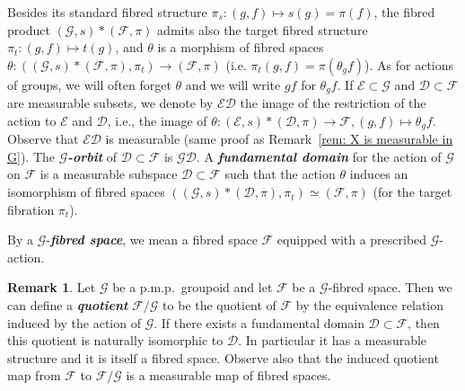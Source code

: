 \documentclass[10pt]{amsart}
\theoremstyle{definition}
\newtheorem{rema}[cdrthm]{Remark}
\newcommand{\defin}[1]{\textbf{\emph{#1}}}
\newcommand{\coarse}{\mathcal{E}}
\newcommand{\cg}{\mathcal{G}}
\newcommand{\cf}{\mathcal{F}}
\newcommand{\cd}{\mathcal{D}}
\newcommand{\pmp}{p.m.p.\ }
\begin{document}
Besides its standard fibred structure $\pi_s:(g,f)\mapsto s(g)=\pi(f)$, the fibred product $(\cg,s) \ast (\cf,\pi)$ admits also the target fibred structure $\pi_t:(g,f)\mapsto t(g)$, and $\theta$ is a morphism of fibred spaces $\theta:((\cg,s) \ast (\cf,\pi), \pi_t) \to (\cf,\pi)$ (i.e. $\pi_t(g,f)=\pi(\theta_g f)$). As for actions of groups, we will often forget $\theta$ and we will write $gf$ for $\theta_g f$. If $\coarse \subset \cg$ and $\cd \subset \cf$ are measurable subsets, we denote by $\coarse \cd$ the image of the restriction of the action to $\coarse$ and $\cd$, i.e., the image of $\theta:(\coarse,s)*(\cd, \pi)\rightarrow \cf, (g,f)\mapsto \theta_g f$. Observe that $\coarse \cd$ is measurable (same proof as Remark~\ref{rem: X is measurable in G}). The
\defin{$\cg$-orbit} of $\cd \subset \cf$ is $\cg \cd$. A
\defin{fundamental domain} for the action of $\cg$ on $\cf$ is a measurable subspace $\cd \subset \cf$ such that the action $\theta$ induces an isomorphism of fibred spaces $\left(\left(\cg,s\right)*\left(\cd, \pi\right), \pi_t\right)\simeq (\cf, \pi)$ (for the target fibration $\pi_t$).

By a $\cg$-\defin{fibred space}, we mean a fibred space $\cf$ equipped with a prescribed $\cg$-action.

\begin{rema}\label{ex:quotient fibred}
Let $\cg$ be a \pmp groupoid and let $\cf$ be a $\cg$-fibred space. Then we can define a \defin{quotient} $\cf/\cg$ to be the quotient of $\cf$ by the equivalence relation induced by the action of $\cg$. If there exists a fundamental domain $\cd\subset \cf$, then this quotient is naturally isomorphic to $\cd$. In particular it has a measurable structure and it is itself a fibred space. Observe also that the induced quotient map from $\cf$ to $\cf/\cg$ is a measurable map of fibred spaces.
\end{rema}
\end{document}

